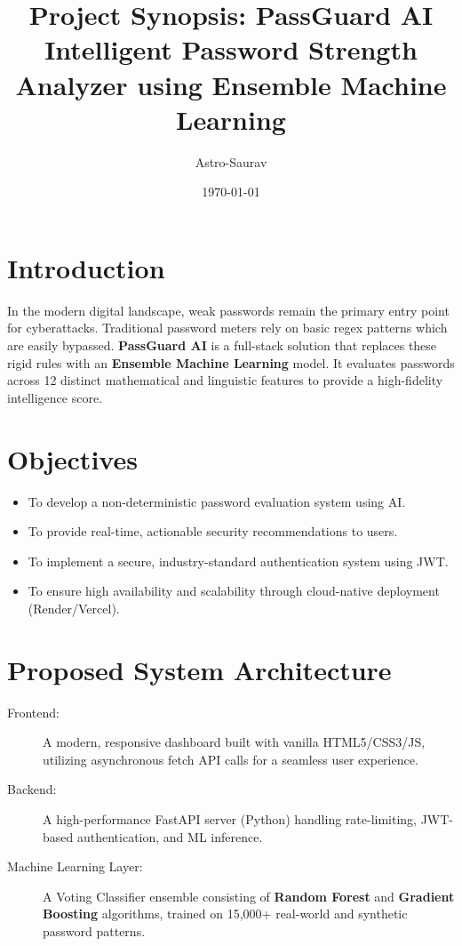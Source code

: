 \documentclass[12pt,a4paper]{article}
\title{\textbf{Project Synopsis: PassGuard AI}\\ \large Intelligent Password Strength Analyzer using Ensemble Machine Learning}
\author{Astro-Saurav}
\date{\today}
\begin{document}
\maketitle

\section{Introduction}
In the modern digital landscape, weak passwords remain the primary entry point for cyberattacks. Traditional password meters rely on basic regex patterns which are easily bypassed. \textbf{PassGuard AI} is a full-stack solution that replaces these rigid rules with an \textbf{Ensemble Machine Learning} model. It evaluates passwords across 12 distinct mathematical and linguistic features to provide a high-fidelity intelligence score.

\section{Objectives}
\begin{itemize}[noitemsep]
    \item To develop a non-deterministic password evaluation system using AI.
    \item To provide real-time, actionable security recommendations to users.
    \item To implement a secure, industry-standard authentication system using JWT.
    \item To ensure high availability and scalability through cloud-native deployment (Render/Vercel).
\end{itemize}

\section{Proposed System Architecture}
\begin{description}
    \item[Frontend:] A modern, responsive dashboard built with vanilla HTML5/CSS3/JS, utilizing asynchronous fetch API calls for a seamless user experience.
    \item[Backend:] A high-performance FastAPI server (Python) handling rate-limiting, JWT-based authentication, and ML inference.
    \item[Machine Learning Layer:] A Voting Classifier ensemble consisting of \textbf{Random Forest} and \textbf{Gradient Boosting} algorithms, trained on 15,000+ real-world and synthetic password patterns.
\end{description}
\end{document}
